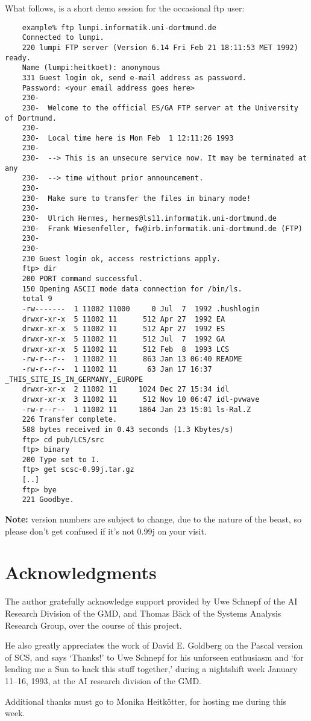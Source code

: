 What follows, is a short demo session for the occasional ftp user:
{\footnotesize
\begin{verbatim}
    example% ftp lumpi.informatik.uni-dortmund.de
    Connected to lumpi.
    220 lumpi FTP server (Version 6.14 Fri Feb 21 18:11:53 MET 1992) ready.
    Name (lumpi:heitkoet): anonymous
    331 Guest login ok, send e-mail address as password.
    Password: <your email address goes here>
    230-
    230-  Welcome to the official ES/GA FTP server at the University of Dortmund.
    230-
    230-  Local time here is Mon Feb  1 12:11:26 1993
    230-
    230-  --> This is an unsecure service now. It may be terminated at any
    230-  --> time without prior announcement.
    230-
    230-  Make sure to transfer the files in binary mode!
    230-
    230-  Ulrich Hermes, hermes@ls11.informatik.uni-dortmund.de
    230-  Frank Wiesenfeller, fw@irb.informatik.uni-dortmund.de (FTP)
    230-
    230-
    230 Guest login ok, access restrictions apply.
    ftp> dir
    200 PORT command successful.
    150 Opening ASCII mode data connection for /bin/ls.
    total 9
    -rw-------  1 11002 11000     0 Jul  7  1992 .hushlogin
    drwxr-xr-x  5 11002 11      512 Apr 27  1992 EA
    drwxr-xr-x  5 11002 11      512 Apr 27  1992 ES
    drwxr-xr-x  5 11002 11      512 Jul  7  1992 GA
    drwxr-xr-x  5 11002 11      512 Feb  8  1993 LCS
    -rw-r--r--  1 11002 11      863 Jan 13 06:40 README
    -rw-r--r--  1 11002 11       63 Jan 17 16:37 _THIS_SITE_IS_IN_GERMANY,_EUROPE
    drwxr-xr-x  2 11002 11     1024 Dec 27 15:34 idl
    drwxr-xr-x  3 11002 11      512 Nov 10 06:47 idl-pvwave
    -rw-r--r--  1 11002 11     1864 Jan 23 15:01 ls-Ral.Z
    226 Transfer complete.
    588 bytes received in 0.43 seconds (1.3 Kbytes/s)
    ftp> cd pub/LCS/src
    ftp> binary
    200 Type set to I.
    ftp> get scsc-0.99j.tar.gz
    [..]
    ftp> bye
    221 Goodbye.
\end{verbatim}
}

{\bf Note:} version numbers are subject to change, due
to the nature of the beast, so please don't get confused if it's not
0.99j on your visit.


\section*{Acknowledgments}

The author gratefully acknowledge support provided by Uwe Schnepf
of the AI Research Division of the GMD, and Thomas B\"ack
of the Systems Analysis Research Group, over the course of this project.

He also greatly appreciates the work of David E. Goldberg
on the Pascal version of SCS, and says `Thanks!' to  Uwe Schnepf for his
unforseen enthusiasm and `for lending me a Sun to hack this stuff together,'
during a nightshift week January
11--16, 1993, at the AI research division of the GMD.

Additional thanks must go to Monika Heitk\"otter, for hosting me during this
week.






